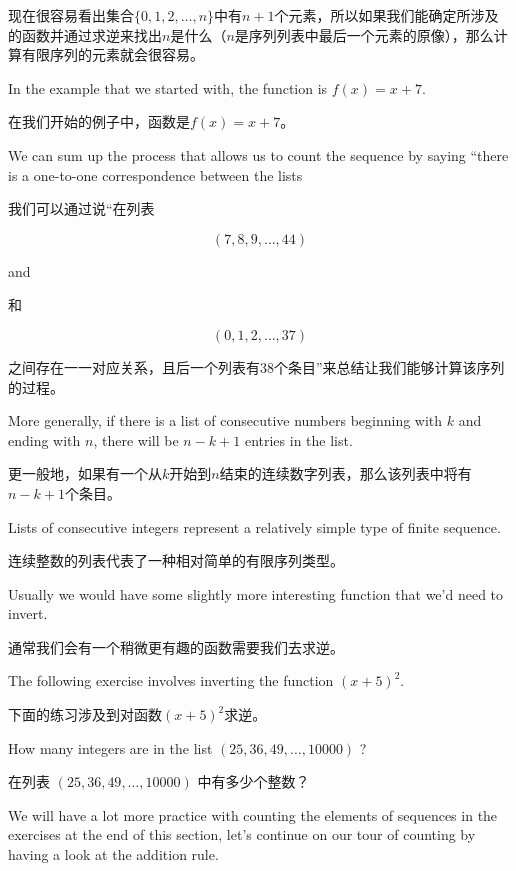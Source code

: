 现在很容易看出集合$\{0, 1, 2, \ldots , n \}$中有$n+1$个元素，所以如果我们能确定所涉及的函数并通过求逆来找出$n$是什么（$n$是序列列表中最后一个元素的原像），那么计算有限序列的元素就会很容易。

In the example that we started with, the function is $f(x)=x+7$.

在我们开始的例子中，函数是$f(x)=x+7$。

We
can sum up the process that allows us to count the sequence by saying
``there is a one-to-one correspondence between the lists %

我们可以通过说“在列表

\[ (7, 8, 9, \ldots , 44 ) \]

\noindent and

\noindent 和

\[ (0, 1, 2, \ldots , 37 ) \]

\noindent 之间存在一一对应关系，且后一个列表有38个条目”来总结让我们能够计算该序列的过程。

More generally, if there is a list of consecutive numbers beginning
with $k$ and ending with $n$, there will be $n-k+1$ entries in the 
list.

更一般地，如果有一个从$k$开始到$n$结束的连续数字列表，那么该列表中将有$n-k+1$个条目。

Lists of consecutive integers represent a relatively simple
type of finite sequence.

连续整数的列表代表了一种相对简单的有限序列类型。

Usually we would have some slightly more
interesting function that we'd need to invert.

通常我们会有一个稍微更有趣的函数需要我们去求逆。

The following exercise involves inverting the function $(x+5)^2$.

下面的练习涉及到对函数$(x+5)^2$求逆。

\begin{exer}
How many integers are in the list $(25, 36, 49, \ldots , 10000)$ ?
\end{exer}

\begin{exer}
在列表 $(25, 36, 49, \ldots , 10000)$ 中有多少个整数？
\end{exer}

We will have a lot more practice with counting the elements of sequences
in the exercises at the end of this section, let's continue on our
tour of counting by having a look at the addition rule.

